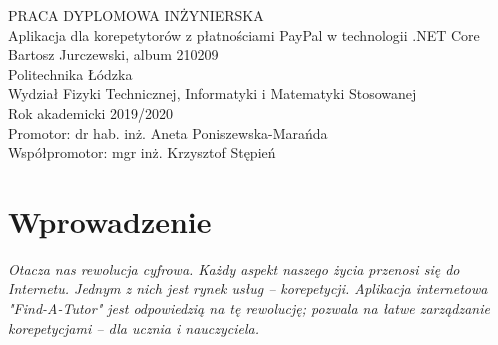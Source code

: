 \documentclass[12pt]{article}
\numberwithin{figure}{section}
\begin{document}
\begin{sloppypar}
\begin{titlepage}
 \thispagestyle{empty}
 \begin{center}
  \vspace{3cm}
  \large
    PRACA DYPLOMOWA INŻYNIERSKA\\
  \vspace{4cm}
  \Huge
    Aplikacja dla korepetytorów z płatnościami PayPal w technologii .NET Core\\
  \large
  \vspace{2cm}
  Bartosz Jurczewski, album 210209\\
  \bigbreak
  Politechnika Łódzka\\
  Wydział Fizyki Technicznej, Informatyki i Matematyki Stosowanej\\
  Rok akademicki 2019/2020\\
  \bigbreak
   Promotor: dr hab. inż. Aneta Poniszewska-Marańda \\
   Współpromotor: mgr inż. Krzysztof Stępień\\
 \end{center}
\end{titlepage}

\clearpage
{}
\setcounter{page}{2}
\setcounter{secnumdepth}{3}

\tableofcontents
\pagebreak

\pagebreak
\section{Wprowadzenie}
\textit{Otacza nas rewolucja cyfrowa. Każdy aspekt naszego życia przenosi się do Internetu. Jednym z nich jest rynek usług -- korepetycji. Aplikacja internetowa "Find-A-Tutor" jest odpowiedzią na tę rewolucję; pozwala na łatwe zarządzanie korepetycjami -- dla ucznia i nauczyciela.}

\end{sloppypar}
\end{document}
